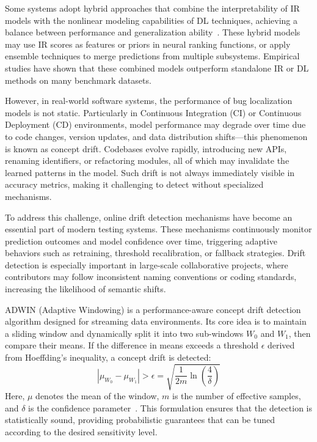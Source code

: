 \documentclass[manuscript,screen,review]{acmart}
\begin{document}
Some systems adopt hybrid approaches that combine the interpretability of IR models with the nonlinear modeling capabilities of DL techniques, achieving a balance between performance and generalization ability~\cite{Li2024}. These hybrid models may use IR scores as features or priors in neural ranking functions, or apply ensemble techniques to merge predictions from multiple subsystems. Empirical studies have shown that these combined models outperform standalone IR or DL methods on many benchmark datasets.

However, in real-world software systems, the performance of bug localization models is not static. Particularly in Continuous Integration (CI) or Continuous Deployment (CD) environments, model performance may degrade over time due to code changes, version updates, and data distribution shifts—this phenomenon is known as concept drift. Codebases evolve rapidly, introducing new APIs, renaming identifiers, or refactoring modules, all of which may invalidate the learned patterns in the model. Such drift is not always immediately visible in accuracy metrics, making it challenging to detect without specialized mechanisms.

To address this challenge, online drift detection mechanisms have become an essential part of modern testing systems. These mechanisms continuously monitor prediction outcomes and model confidence over time, triggering adaptive behaviors such as retraining, threshold recalibration, or fallback strategies. Drift detection is especially important in large-scale collaborative projects, where contributors may follow inconsistent naming conventions or coding standards, increasing the likelihood of semantic shifts.

ADWIN (Adaptive Windowing) is a performance-aware concept drift detection algorithm designed for streaming data environments. Its core idea is to maintain a sliding window and dynamically split it into two sub-windows \( W_0 \) and \( W_1 \), then compare their means. If the difference in means exceeds a threshold \( \epsilon \) derived from Hoeffding’s inequality, a concept drift is detected:
\[
\left| \mu_{W_0} - \mu_{W_1} \right| > \epsilon = \sqrt{ \frac{1}{2m} \ln \left( \frac{4}{\delta} \right) }
\]
Here, \( \mu \) denotes the mean of the window, \( m \) is the number of effective samples, and \( \delta \) is the confidence parameter~\cite{Bifet2007}.
This formulation ensures that the detection is statistically sound, providing probabilistic guarantees that can be tuned according to the desired sensitivity level.
\end{document}
